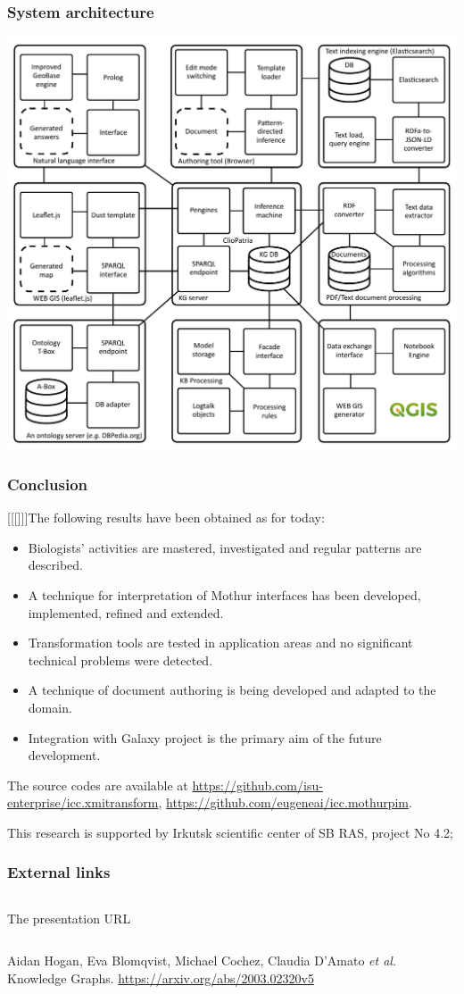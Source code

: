 \documentclass[10pt]{beamer}
\begin{document}
\begin{frame}
  \frametitle{System architecture}
  \centering
  \includegraphics[width=0.8\linewidth]{architecture.pdf}
\end{frame}

\begin{frame}
  \frametitle{Conclusion}
  [[[]]]The following results have been obtained as for today:
  \begin{itemize}
  \item Biologists' activities are mastered, investigated and regular patterns are described.
  \item A technique for interpretation of Mothur interfaces has been developed, implemented, refined and extended.
  \item Transformation tools are tested in application areas and no significant technical problems were detected.
  \item A technique of document authoring is being developed and adapted to the domain.
  \item Integration with Galaxy project is the primary aim of the future development.
  \end{itemize}
  The source codes are available at \url{https://github.com/isu-enterprise/icc.xmitransform}, \url{https://github.com/eugeneai/icc.mothurpim}.

  This research is supported by Irkutsk scientific center of SB RAS, project No 4.2;
\end{frame}

\begin{frame}
  \frametitle{External links}
  \begin{columns}
    \begin{column}{0.5\textwidth}\centering
      The presentation URL
    \end{column}
  \end{columns}
\begin{thebibliography}{99}

  Aidan Hogan, Eva Blomqvist, Michael Cochez, Claudia D’Amato \emph{et al}. Knowledge Graphs.
  \url{https://arxiv.org/abs/2003.02320v5}
\end{thebibliography}
\end{frame}
\end{document}
